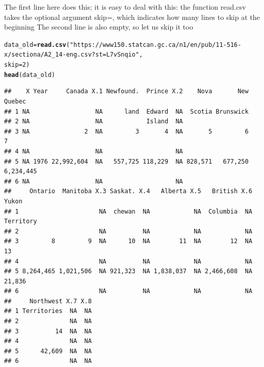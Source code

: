 \documentclass[aspectratio=169]{beamer}\usepackage[]{graphicx}\usepackage[]{xcolor}
\makeatletter
\newcommand{\hlnum}[1]{\textcolor[rgb]{0.686,0.059,0.569}{#1}}%
\newcommand{\hlstr}[1]{\textcolor[rgb]{0.192,0.494,0.8}{#1}}%
\newcommand{\hlstd}[1]{\textcolor[rgb]{0.345,0.345,0.345}{#1}}%
\newcommand{\hlkwb}[1]{\textcolor[rgb]{0.69,0.353,0.396}{#1}}%
\newcommand{\hlkwc}[1]{\textcolor[rgb]{0.333,0.667,0.333}{#1}}%
\newcommand{\hlkwd}[1]{\textcolor[rgb]{0.737,0.353,0.396}{\textbf{#1}}}%
\newenvironment{kframe}{%
 \def\at@end@of@kframe{}%
 \ifinner\ifhmode%
  \def\at@end@of@kframe{\end{minipage}}%
  \begin{minipage}{\columnwidth}%
 \fi\fi%
 \def\FrameCommand##1{\hskip\@totalleftmargin \hskip-\fboxsep
 \colorbox{shadecolor}{##1}\hskip-\fboxsep
     \hskip-\linewidth \hskip-\@totalleftmargin \hskip\columnwidth}%
 \MakeFramed {\advance\hsize-\width
   \@totalleftmargin\z@ \linewidth\hsize
   \@setminipage}}%
 {\par\unskip\endMakeFramed%
 \at@end@of@kframe}
\newenvironment{knitrout}{}{} %
\makeatother
\begin{document}
\begin{frame}[fragile]
The first line here does this; it is easy to deal with this: the function read.csv takes the optional argument skip=, which indicates how many lines to skip at the beginning
The second line is also empty, so let us skip it too

\begin{knitrout}
\color{fgcolor}\begin{kframe}
\begin{alltt}
\hlstd{data_old} \hlkwb{=} \hlkwd{read.csv}\hlstd{(}\hlstr{"https://www150.statcan.gc.ca/n1/en/pub/11-516-x/sectiona/A2_14-eng.csv?st=L7vSnqio"}\hlstd{,}
                    \hlkwc{skip} \hlstd{=} \hlnum{2}\hlstd{)}
\hlkwd{head}\hlstd{(data_old)}
\end{alltt}
\begin{verbatim}
##    X Year     Canada X.1 Newfound.  Prince X.2    Nova       New    Quebec
## 1 NA                  NA      land  Edward  NA  Scotia Brunswick          
## 2 NA                  NA            Island  NA                            
## 3 NA               2  NA         3       4  NA       5         6         7
## 4 NA                  NA                    NA                            
## 5 NA 1976 22,992,604  NA   557,725 118,229  NA 828,571   677,250 6,234,445
## 6 NA                  NA                    NA                            
##     Ontario  Manitoba X.3 Saskat. X.4   Alberta X.5   British X.6     Yukon
## 1                      NA  chewan  NA            NA  Columbia  NA Territory
## 2                      NA          NA            NA            NA          
## 3         8         9  NA      10  NA        11  NA        12  NA        13
## 4                      NA          NA            NA            NA          
## 5 8,264,465 1,021,506  NA 921,323  NA 1,838,037  NA 2,466,608  NA    21,836
## 6                      NA          NA            NA            NA          
##     Northwest X.7 X.8
## 1 Territories  NA  NA
## 2              NA  NA
## 3          14  NA  NA
## 4              NA  NA
## 5      42,609  NA  NA
## 6              NA  NA
\end{verbatim}
\end{kframe}
\end{knitrout}
\end{frame}
\end{document}

